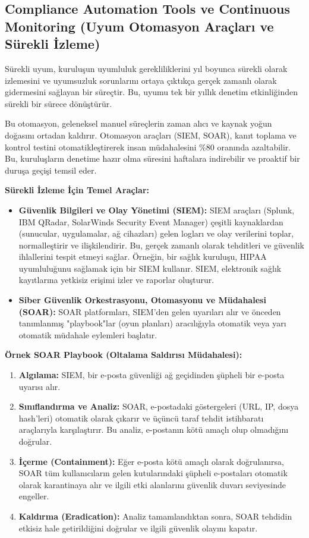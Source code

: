 \subsection{Compliance Automation Tools ve Continuous Monitoring (Uyum Otomasyon Araçları ve Sürekli İzleme)}

Sürekli uyum, kuruluşun uyumluluk gerekliliklerini yıl boyunca sürekli olarak izlemesini ve uyumsuzluk sorunlarını ortaya çıktıkça gerçek zamanlı olarak gidermesini sağlayan bir süreçtir. Bu, uyumu tek bir yıllık denetim etkinliğinden sürekli bir sürece dönüştürür.

Bu otomasyon, geleneksel manuel süreçlerin zaman alıcı ve kaynak yoğun doğasını ortadan kaldırır. Otomasyon araçları (SIEM, SOAR), kanıt toplama ve kontrol testini otomatikleştirerek insan müdahalesini \%80 oranında azaltabilir. Bu, kuruluşların denetime hazır olma süresini haftalara indirebilir ve proaktif bir duruşa geçişi temsil eder.

\textbf{Sürekli İzleme İçin Temel Araçlar:}
\begin{itemize}
    \item \textbf{Güvenlik Bilgileri ve Olay Yönetimi (SIEM):} SIEM araçları (Splunk, IBM QRadar, SolarWinds Security Event Manager) çeşitli kaynaklardan (sunucular, uygulamalar, ağ cihazları) gelen logları ve olay verilerini toplar, normalleştirir ve ilişkilendirir. Bu, gerçek zamanlı olarak tehditleri ve güvenlik ihlallerini tespit etmeyi sağlar. Örneğin, bir sağlık kuruluşu, HIPAA uyumluluğunu sağlamak için bir SIEM kullanır. SIEM, elektronik sağlık kayıtlarına yetkisiz erişimi izler ve raporlar oluşturur.
    \item \textbf{Siber Güvenlik Orkestrasyonu, Otomasyonu ve Müdahalesi (SOAR):} SOAR platformları, SIEM'den gelen uyarıları alır ve önceden tanımlanmış "playbook"lar (oyun planları) aracılığıyla otomatik veya yarı otomatik müdahale eylemleri başlatır.
\end{itemize}

\textbf{Örnek SOAR Playbook (Oltalama Saldırısı Müdahalesi):}
\begin{enumerate}
    \item \textbf{Algılama:} SIEM, bir e-posta güvenliği ağ geçidinden şüpheli bir e-posta uyarısı alır.
    \item \textbf{Sınıflandırma ve Analiz:} SOAR, e-postadaki göstergeleri (URL, IP, dosya hash'leri) otomatik olarak çıkarır ve üçüncü taraf tehdit istihbaratı araçlarıyla karşılaştırır. Bu analiz, e-postanın kötü amaçlı olup olmadığını doğrular.
    \item \textbf{İçerme (Containment):} Eğer e-posta kötü amaçlı olarak doğrulanırsa, SOAR tüm kullanıcıların gelen kutularındaki şüpheli e-postaları otomatik olarak karantinaya alır ve ilgili etki alanlarını güvenlik duvarı seviyesinde engeller.
    \item \textbf{Kaldırma (Eradication):} Analiz tamamlandıktan sonra, SOAR tehdidin etkisiz hale getirildiğini doğrular ve ilgili güvenlik olayını kapatır.
\end{enumerate}

